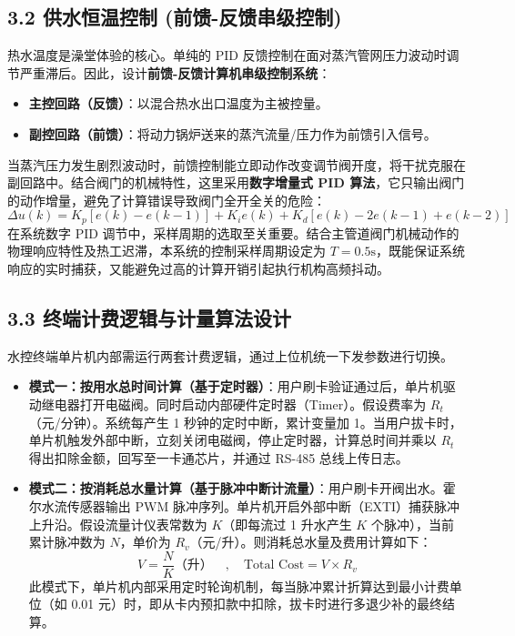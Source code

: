 \documentclass[11pt,a4paper,UTF8]{ctexart}
\begin{document}
\subsection{3.2 供水恒温控制 (前馈-反馈串级控制)}
热水温度是澡堂体验的核心。单纯的 PID 反馈控制在面对蒸汽管网压力波动时调节严重滞后。因此，设计\textbf{前馈-反馈计算机串级控制系统}：
\begin{itemize}
    \item \textbf{主控回路（反馈）}：以混合热水出口温度为主被控量。
    \item \textbf{副控回路（前馈）}：将动力锅炉送来的蒸汽流量/压力作为前馈引入信号。
\end{itemize}
当蒸汽压力发生剧烈波动时，前馈控制能立即动作改变调节阀开度，将干扰克服在副回路中。结合阀门的机械特性，这里采用\textbf{数字增量式 PID 算法}，它只输出阀门的动作增量，避免了计算错误导致阀门全开全关的危险：
\begin{equation}
\Delta u(k) = K_p [e(k) - e(k-1)] + K_i e(k) + K_d [e(k) - 2e(k-1) + e(k-2)]
\end{equation}
在系统数字 PID 调节中，采样周期的选取至关重要。结合主管道阀门机械动作的物理响应特性及热工迟滞，本系统的控制采样周期设定为 $T=0.5\text{s}$，既能保证系统响应的实时捕获，又能避免过高的计算开销引起执行机构高频抖动。

\subsection{3.3 终端计费逻辑与计量算法设计}
水控终端单片机内部需运行两套计费逻辑，通过上位机统一下发参数进行切换。
\begin{itemize}
    \item \textbf{模式一：按用水总时间计算（基于定时器）}：用户刷卡验证通过后，单片机驱动继电器打开电磁阀。同时启动内部硬件定时器（Timer）。假设费率为 $R_t$（元/分钟）。系统每产生 1 秒钟的定时中断，累计变量加 1。当用户拔卡时，单片机触发外部中断，立刻关闭电磁阀，停止定时器，计算总时间并乘以 $R_t$ 得出扣除金额，回写至一卡通芯片，并通过 RS-485 总线上传日志。
    \item \textbf{模式二：按消耗总水量计算（基于脉冲中断计流量）}：用户刷卡开阀出水。霍尔水流传感器输出 PWM 脉冲序列。单片机开启外部中断（EXTI）捕获脉冲上升沿。假设流量计仪表常数为 $K$（即每流过 1 升水产生 $K$ 个脉冲），当前累计脉冲数为 $N$，单价为 $R_v$（元/升）。则消耗总水量及费用计算如下：
    \begin{equation}
    V = \frac{N}{K} \text{（升）} \quad , \quad \text{Total Cost} = V \times R_v
    \end{equation}
    此模式下，单片机内部采用定时轮询机制，每当脉冲累计折算达到最小计费单位（如 0.01 元）时，即从卡内预扣款中扣除，拔卡时进行多退少补的最终结算。
\end{itemize}
\end{document}
